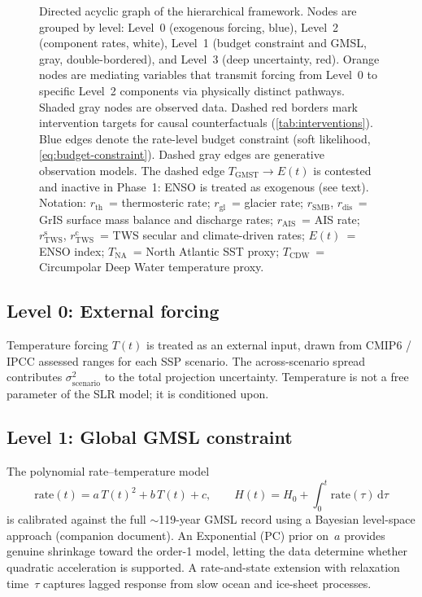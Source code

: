\documentclass[11pt]{article}
\newcommand{\GMST}{\text{GMST}}
\newcommand{\CDW}{\text{CDW}}
\begin{document}
\begin{figure}[p]
{\begin{tikzpicture}
\end{tikzpicture}
}%
\caption{Directed acyclic graph of the hierarchical framework.  Nodes are grouped by level: Level~0 (exogenous forcing, blue), Level~2 (component rates, white), Level~1 (budget constraint and GMSL, gray, double-bordered), and Level~3 (deep uncertainty, red).  Orange nodes are mediating variables that transmit forcing from Level~0 to specific Level~2 components via physically distinct pathways.  Shaded gray nodes are observed data.  Dashed red borders mark intervention targets for causal counterfactuals (\cref{tab:interventions}).  Blue edges denote the rate-level budget constraint (soft likelihood, \cref{eq:budget-constraint}).  Dashed gray edges are generative observation models.  The dashed edge $T_{\GMST} \to E(t)$ is contested and inactive in Phase~1: ENSO is treated as exogenous (see text).  Notation: $r_{\text{th}}$~= thermosteric rate; $r_{\text{gl}}$~= glacier rate; $r_{\text{SMB}}$, $r_{\text{dis}}$~= GrIS surface mass balance and discharge rates; $r_{\text{AIS}}$~= AIS rate; $r_{\text{TWS}}^{\text{s}}$, $r_{\text{TWS}}^{\text{c}}$~= TWS secular and climate-driven rates; $E(t)$~= ENSO index; $T_{\text{NA}}$~= North Atlantic SST proxy; $T_{\CDW}$~= Circumpolar Deep Water temperature proxy.}
\label{fig:dag}
\end{figure}

\subsection{Level 0: External forcing}

Temperature forcing $T(t)$ is treated as an external input, drawn from CMIP6 / IPCC assessed ranges for each SSP scenario.  The across-scenario spread contributes $\sigma_{\text{scenario}}^2$ to the total projection uncertainty.  Temperature is not a free parameter of the SLR model; it is conditioned upon.

\subsection{Level 1: Global GMSL constraint}

The polynomial rate--temperature model
\begin{equation}
  \text{rate}(t) = a\,T(t)^2 + b\,T(t) + c, \qquad
  H(t) = H_0 + \int_0^t \text{rate}(\tau)\,\mathrm{d}\tau
  \label{eq:rate-model}
\end{equation}
is calibrated against the full $\sim$119-year GMSL record using a Bayesian level-space approach (companion document).  An Exponential (PC) prior on~$a$ provides genuine shrinkage toward the order-1 model, letting the data determine whether quadratic acceleration is supported.  A rate-and-state extension with relaxation time~$\tau$ captures lagged response from slow ocean and ice-sheet processes.
\end{document}
